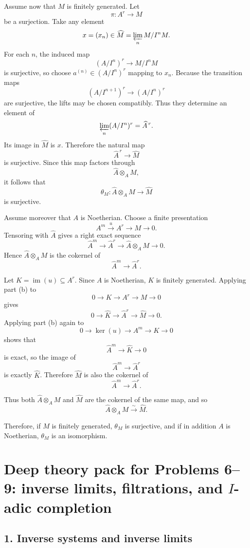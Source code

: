 \documentclass[12pt,a4paper]{article}
\theoremstyle{plain}
\theoremstyle{definition}      %
\begin{document}
\medskip
Assume now that \(M\) is finitely generated. Let
\[
\pi:A^r\to M
\]
be a surjection. Take any element
\[
x=(x_n)\in \widehat{M}=\varprojlim_n M/I^nM.
\]
For each \(n\), the induced map
\[
(A/I^n)^r\to M/I^nM
\]
is surjective, so choose \(a^{(n)}\in (A/I^n)^r\) mapping to \(x_n\). Because the transition maps
\[
(A/I^{n+1})^r\to (A/I^n)^r
\]
are surjective, the lifts may be chosen compatibly. Thus they determine an element of
\[
\varprojlim_n (A/I^n)^r = \widehat{A}^{\,r}.
\]
Its image in \(\widehat{M}\) is \(x\). Therefore the natural map
\[
\widehat{A}^{\,r}\to \widehat{M}
\]
is surjective. Since this map factors through
\[
\widehat{A}\otimes_A M,
\]
it follows that
\[
\theta_M:\widehat{A}\otimes_A M\to \widehat{M}
\]
is surjective.

\medskip
Assume moreover that \(A\) is Noetherian. Choose a finite presentation
\[
A^m\xrightarrow{u} A^r\to M\to 0.
\]
Tensoring with \(\widehat{A}\) gives a right exact sequence
\[
\widehat{A}^m\to \widehat{A}^r\to \widehat{A}\otimes_A M\to 0.
\]
Hence \(\widehat{A}\otimes_A M\) is the cokernel of
\[
\widehat{A}^m\to \widehat{A}^r.
\]

Let \(K=\operatorname{im}(u)\subseteq A^r\). Since \(A\) is Noetherian, \(K\) is finitely generated. Applying part (b) to
\[
0\to K\to A^r\to M\to 0
\]
gives
\[
0\to \widehat{K}\to \widehat{A}^r\to \widehat{M}\to 0.
\]
Applying part (b) again to
\[
0\to \ker(u)\to A^m\to K\to 0
\]
shows that
\[
\widehat{A}^m\to \widehat{K}\to 0
\]
is exact, so the image of
\[
\widehat{A}^m\to \widehat{A}^r
\]
is exactly \(\widehat{K}\). Therefore \(\widehat{M}\) is also the cokernel of
\[
\widehat{A}^m\to \widehat{A}^r.
\]

Thus both \(\widehat{A}\otimes_A M\) and \(\widehat{M}\) are the cokernel of the same map, and so
\[
\widehat{A}\otimes_A M \xrightarrow{\sim} \widehat{M}.
\]

Therefore, if \(M\) is finitely generated, \(\theta_M\) is surjective, and if in addition \(A\) is Noetherian, \(\theta_M\) is an isomorphism.


\section*{Deep theory pack for Problems 6--9: inverse limits, filtrations, and \(I\)-adic completion}

\subsection*{1. Inverse systems and inverse limits}
\end{document}
